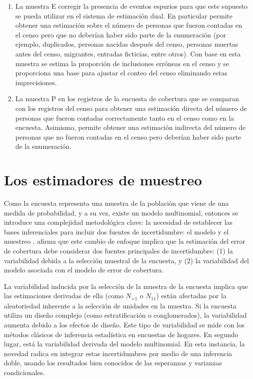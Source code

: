 \documentclass[
  12pt,
]{book}
\begin{document}
\begin{enumerate}
\def\labelenumi{\arabic{enumi}.}
\item
  La muestra E corregir la presencia de eventos espurios para que este supuesto se pueda utilizar en el sistema de estimación dual. En particular permite obtener una estimación sobre el número de personas que fueron contadas en el censo pero que no deberían haber sido parte de la enumeración (por ejemplo, duplicados, personas nacidas después del censo, personas muertas antes del censo, migrantes, entradas ficticias, entre otros). Con base en esta muestra se estima la proporción de inclusiones erróneas en el censo y se proporciona una base para ajustar el conteo del censo eliminando estas imprecisiones.
\item
  La muestra P en los registros de la encuesta de cobertura que se comparan con los registros del censo para obtener una estimación directa del número de personas que fueron contadas correctamente tanto en el censo como en la encuesta. Asimismo, permite obtener una estimación indirecta del número de personas que no fueron contadas en el censo pero deberían haber sido parte de la enumeración.
\end{enumerate}

\section{Los estimadores de muestreo}\label{los-estimadores-de-muestreo}

Como la encuesta representa una muestra de la población que viene de una medida de probabilidad, y a su vez, existe un modelo multinomial, entonces se introduce una complejidad metodológica clave: la necesidad de establecer las bases inferenciales para incluir dos fuentes de incertidumbre: el modelo y el muestreo \citep{Binder_2011}. \citet{wolter1986coverage} afirma que este cambio de enfoque implica que la estimación del error de cobertura debe considerar dos fuentes principales de incertidumbre: (1) la variabilidad debida a la selección muestral de la encuesta, y (2) la variabilidad del modelo asociada con el modelo de error de cobertura.

La variabilidad inducida por la selección de la muestra de la encuesta implica que las estimaciones derivadas de ella (como \(N_{+1}\) o \(N_{11}\)) están afectadas por la aleatoriedad inherente a la selección de unidades en la muestra. Si la encuesta utiliza un diseño complejo (como estratificación o conglomerados), la variabilidad aumenta debido a los efectos de diseño. Este tipo de variabilidad se mide con los métodos clásicos de inferencia estadística en encuestas de hogares. En segundo lugar, está la variabilidad derivada del modelo multinomial. En esta instancia, la novedad radica en integrar estas incertidumbres por medio de una inferencia doble, usando los resultados bien conocidos de las esperanzas y varianzas condicionales.
\end{document}
